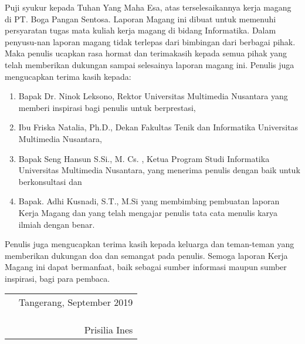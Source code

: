 

Puji syukur kepada Tuhan Yang Maha Esa, atas terselesaikannya kerja magang di PT. Boga Pangan Sentosa. 
Laporan Magang ini dibuat untuk memenuhi persyaratan tugas mata kuliah kerja magang di bidang Informatika. 
Dalam penyusu-\newline nan laporan magang tidak terlepas dari bimbingan dari berbagai pihak. 
Maka penulis ucapkan rasa hormat dan terimakasih kepada semua pihak yang telah 
memberikan dukungan sampai selesainya laporan magang ini.
Penulis juga mengucapkan terima kasih kepada:
\begin{enumerate}
    \item Bapak Dr. Ninok Leksono, Rektor Universitas Multimedia Nusantara yang memberi inspirasi bagi penulis untuk berprestasi,
    \item Ibu Friska Natalia, Ph.D., Dekan Fakultas Tenik dan Informatika Universitas Multimedia Nusantara,
    \item Bapak Seng Hansun S.Si., M. Cs. , Ketua Program Studi Informatika Universitas Multimedia Nusantara, yang menerima penulis dengan baik untuk berkonsultasi dan
    \item Bapak. Adhi Kusnadi, S.T., M.Si yang membimbing pembuatan laporan Kerja Magang dan yang telah mengajar penulis tata cata menulis karya ilmiah dengan benar.
\end{enumerate}
    Penulis juga mengucapkan terima kasih kepada keluarga dan teman-teman yang memberikan dukungan doa dan semangat pada penulis.
Semoga laporan Kerja Magang ini dapat bermanfaat, baik sebagai sumber informasi maupun sumber inspirasi, bagi para pembaca.

\begin{tabular}{p{7.5cm}r}
&Tangerang, September 2019\\
&\\
&\\
&\\
&{Prisilia Ines}
\end{tabular}